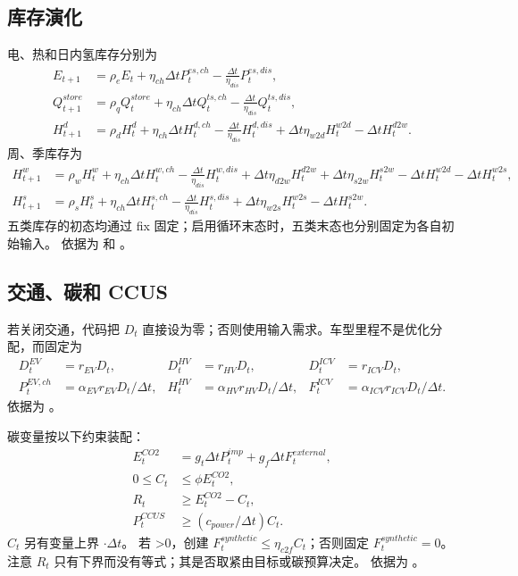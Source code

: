 \subsection{库存演化}

电、热和日内氢库存分别为
\begin{align}
 E_{t+1}&=\rho_eE_t+\eta_{ch}\Delta t P_t^{es,ch}
 -\frac{\Delta t}{\eta_{dis}}P_t^{es,dis},\\
 Q_{t+1}^{store}&=\rho_qQ_t^{store}+\eta_{ch}\Delta t Q_t^{ts,ch}
 -\frac{\Delta t}{\eta_{dis}}Q_t^{ts,dis},\\
 H_{t+1}^{d}&=\rho_dH_t^d+\eta_{ch}\Delta t H_t^{d,ch}
 -\frac{\Delta t}{\eta_{dis}}H_t^{d,dis}
 +\Delta t\eta_{w2d}H_t^{w2d}-\Delta t H_t^{d2w}.
\end{align}
周、季库存为
\begin{align}
 H_{t+1}^{w}&=\rho_wH_t^w+\eta_{ch}\Delta t H_t^{w,ch}
 -\frac{\Delta t}{\eta_{dis}}H_t^{w,dis}
 +\Delta t\eta_{d2w}H_t^{d2w}+\Delta t\eta_{s2w}H_t^{s2w}
 -\Delta t H_t^{w2d}-\Delta t H_t^{w2s},\\
 H_{t+1}^{s}&=\rho_sH_t^s+\eta_{ch}\Delta t H_t^{s,ch}
 -\frac{\Delta t}{\eta_{dis}}H_t^{s,dis}
 +\Delta t\eta_{w2s}H_t^{w2s}-\Delta t H_t^{s2w}.
\end{align}
五类库存的初态均通过 fix 固定；启用循环末态时，五类末态也分别固定为各自初始输入。
依据为  和
。

\subsection{交通、碳和 CCUS}

若关闭交通，代码把 $D_t$ 直接设为零；否则使用输入需求。车型里程不是优化分配，而固定为
\begin{align}
 D_t^{EV}&=r_{EV}D_t,&D_t^{HV}&=r_{HV}D_t,&D_t^{ICV}&=r_{ICV}D_t,\\
 P_t^{EV,ch}&=\alpha_{EV}r_{EV}D_t/\Delta t,&
 H_t^{HV}&=\alpha_{HV}r_{HV}D_t/\Delta t,&
 F_t^{ICV}&=\alpha_{ICV}r_{ICV}D_t/\Delta t.
\end{align}
依据为 。

碳变量按以下约束装配：
\begin{align}
 E_t^{CO2}&=g_t\Delta t P_t^{imp}+g_f\Delta t F_t^{external},\\
 0\le C_t&\le\phi E_t^{CO2},\\
 R_t&\ge E_t^{CO2}-C_t,\\
 P_t^{CCUS}&\ge(c_{power}/\Delta t)C_t.
\end{align}
$C_t$ 另有变量上界 $\cdot\Delta t$。
若 >0，创建
$F_t^{synthetic}\le\eta_{c2f}C_t$；否则固定 $F_t^{synthetic}=0$。
注意 $R_t$ 只有下界而没有等式；其是否取紧由目标或碳预算决定。
依据为 。

